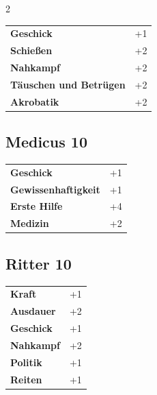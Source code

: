 \begin{multicols}{2}
\begin{tcolorbox}
\begin{tabular}{@{}ll@{}}
    \textbf{Geschick} & +1\\
    \textbf{Schießen} & +2\\
    \textbf{Nahkampf} & +2\\
    \textbf{Täuschen und Betrügen} & +2\\
    \textbf{Akrobatik} & +2\\
\end{tabular}


\end{tcolorbox}

\begin{tcolorbox}
    \subsection*{Medicus \hfill \small{10 }}
    \tcblower




\begin{tabular}{@{}ll@{}}
    \textbf{Geschick} & +1\\
    \textbf{Gewissenhaftigkeit} & +1\\
    \textbf{Erste Hilfe} & +4\\
    \textbf{Medizin} & +2\\
\end{tabular}


\end{tcolorbox}

\begin{tcolorbox}
    \subsection*{Ritter \hfill \small{10 }}
    \tcblower




\begin{tabular}{@{}ll@{}}
    \textbf{Kraft} & +1\\
    \textbf{Ausdauer} & +2\\
    \textbf{Geschick} & +1\\
    \textbf{Nahkampf} & +2\\
    \textbf{Politik} & +1\\
    \textbf{Reiten} & +1\\
\end{tabular}


\end{tcolorbox}
\end{multicols}
